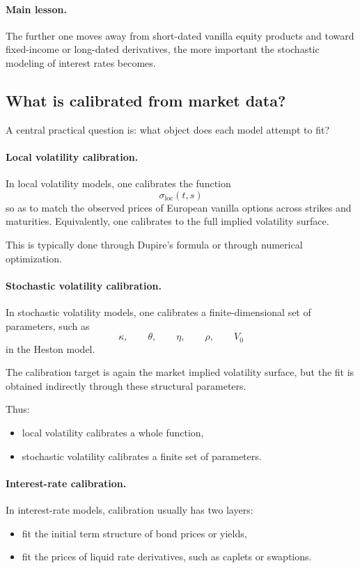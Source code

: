 \documentclass[11pt]{article}
\theoremstyle{plain}
\theoremstyle{definition}
\theoremstyle{remark}
\begin{document}
\paragraph{Main lesson.}
The further one moves away from short-dated vanilla equity products and
toward fixed-income or long-dated derivatives, the more important the
stochastic modeling of interest rates becomes.

\subsection{What is calibrated from market data?}

A central practical question is: what object does each model attempt to
fit?

\paragraph{Local volatility calibration.}
In local volatility models, one calibrates the function
\[
\sigma_{\mathrm{loc}}(t,s)
\]
so as to match the observed prices of European vanilla options across
strikes and maturities.
Equivalently, one calibrates to the full implied volatility surface.

This is typically done through Dupire's formula or through numerical
optimization.

\paragraph{Stochastic volatility calibration.}
In stochastic volatility models, one calibrates a finite-dimensional set
of parameters, such as
\[
\kappa,\qquad \theta,\qquad \eta,\qquad \rho,\qquad V_0
\]
in the Heston model.

The calibration target is again the market implied volatility surface,
but the fit is obtained indirectly through these structural parameters.

Thus:
\begin{itemize}[leftmargin=1.4em]
    \item local volatility calibrates a whole function,
    \item stochastic volatility calibrates a finite set of parameters.
\end{itemize}

\paragraph{Interest-rate calibration.}
In interest-rate models, calibration usually has two layers:
\begin{itemize}[leftmargin=1.4em]
    \item fit the initial term structure of bond prices or yields,
    \item fit the prices of liquid rate derivatives, such as caplets or
    swaptions.
\end{itemize}
\end{document}
